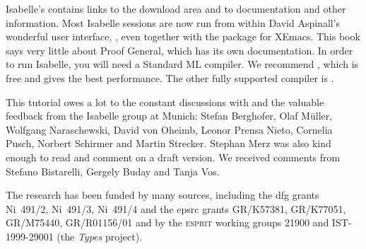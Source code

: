 Isabelle's  contains links to
the download area and to documentation and other information.  Most Isabelle
sessions are now run from within David Aspinall's
wonderful user interface, , even together with the
 package
for XEmacs.  This book says very little about Proof General, which has its own
documentation.  In order to run Isabelle, you will need a Standard ML
compiler.  We recommend , which is
free and gives the best performance.  The other fully supported compiler is
.

This tutorial owes a lot to the constant discussions with and the valuable
feedback from the Isabelle group at Munich: Stefan Berghofer, Olaf
M{\"u}ller, Wolfgang Naraschewski, David von Oheimb, Leonor Prensa Nieto,
Cornelia Pusch, Norbert Schirmer and Martin Strecker. Stephan
Merz was also kind enough to read and comment on a draft version.  We
received comments from Stefano Bistarelli, Gergely Buday and Tanja
Vos.

The research has been funded by many sources, including the {\sc dfg} grants
Ni~491/2, Ni~491/3, Ni~491/4 and the {\sc epsrc} grants GR\slash K57381,
GR\slash K77051, GR\slash M75440, GR\slash R01156\slash 01 and by the
\textsc{esprit} working groups 21900 and IST-1999-29001 (the \emph{Types}
project).
